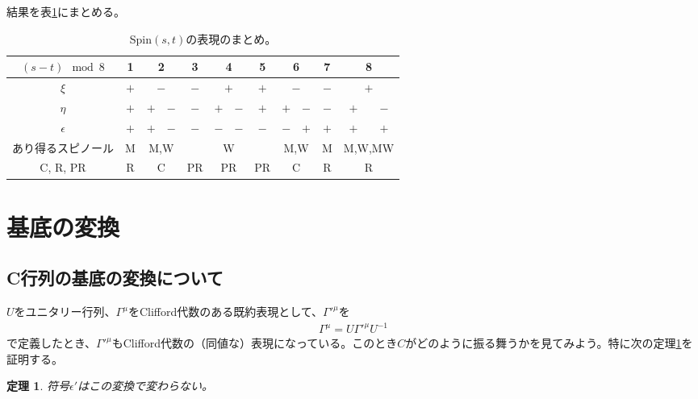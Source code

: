 \documentclass[12pt,a4paper,dvipdfmx]{jlreq}
\newtheorem{theo}{定理}
\begin{document}
結果を表\ref{SpinDrepGen}にまとめる。
\begin{table}[htb]
  \begin{center}
    \begin{tabular}{|c|c|c|c|c|c|c|c|c|c|c|c|c|}\hline
      $(s-t) \mod 8$ & 1 & \multicolumn{2}{|c|}{2} & 3 & \multicolumn{2}{|c|}{4} & 5 & \multicolumn{2}{|c|}{6} & 7 & \multicolumn{2}{|c|}{8} \\ \hline
      $\xi$ & $+$ & \multicolumn{2}{|c|}{$-$} & $-$ & \multicolumn{2}{|c|}{$+$} & $+$ & \multicolumn{2}{|c|}{$-$} & $-$ & \multicolumn{2}{|c|}{$+$} \\\hline
      $\eta$ & $+$ & $+$ & $-$ &  $-$ & $+$ & $-$ & $+$ & $+$ & $-$ & $-$ & $+$ & $-$ \\ \hline
      $\epsilon$ & $+$ & $+$ & $-$ & $-$ & $-$ & $-$ & $-$ & $-$ & $+$ & $+$ & $+$ & $+$ \\ \hline
      あり得るスピノール & M & \multicolumn{2}{|c|}{M,W} &  & \multicolumn{2}{|c|}{W} &  & \multicolumn{2}{|c|}{M,W} & M & \multicolumn{2}{|c|}{M,W,MW} \\ \hline
      C, R, PR & R & \multicolumn{2}{|c|}{C} & PR & \multicolumn{2}{|c|}{PR} & PR & \multicolumn{2}{|c|}{C} & R & \multicolumn{2}{|c|}{R} \\ \hline
    \end{tabular}
  \end{center} 
  \caption{Spin$(s,t)$の表現のまとめ。}
  \label{SpinDrepGen}
\end{table}



\appendix
\section{基底の変換}
\label{app:C}
\subsection{C行列の基底の変換について}
$U$をユニタリー行列、$\Gamma^{\mu}$をClifford代数のある既約表現として、$\Gamma'^{\mu}$を
\begin{align}
  \Gamma^{\mu}=U\Gamma'^{\mu}U^{-1}
  \label{transform}
\end{align}
で定義したとき、$\Gamma'^{\mu}$もClifford代数の（同値な）表現になっている。このとき$C$がどのように振る舞うかを見てみよう。特に次の定理\ref{th:epsilon}を証明する。
\begin{theo}\label{th:epsilon}
  符号$\epsilon'$はこの変換で変わらない。
\end{theo}
\end{document}
